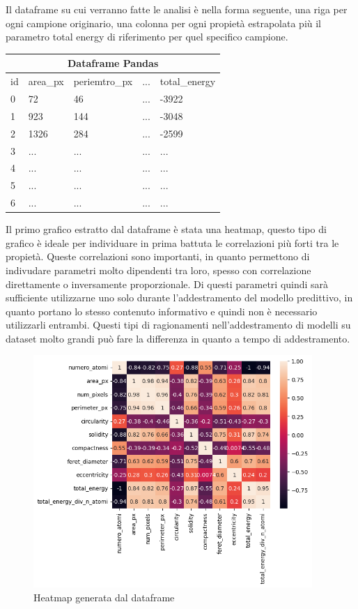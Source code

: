 \documentclass[12pt,a4paper,openright,twoside]{report}
\begin{document}
Il dataframe su cui verranno fatte le analisi è nella forma seguente, una riga per ogni campione originario, una colonna per ogni propietà estrapolata più il parametro total energy di riferimento per quel specifico campione. 

\begin{center}
\begin{tabular}{ |p{1cm}||p{1.5cm}|p{2.5cm}|p{1cm}|p{3cm}|  }
 \hline
 \multicolumn{5}{|c|}{Dataframe Pandas} \\
 \hline
 id & area\_px & periemtro\_px & ... & total\_energy \\
 \hline
 0 & 72 & 46 & ... & -3922\\
 1 & 923 & 144 & ... & -3048\\
 2 & 1326 & 284 & ... & -2599\\
 3 & ... & ... & ... & ...\\
 4 & ... & ... & ... & ...\\
 5 & ... & ... & ... & ...\\
 6 & ... & ... & ... & ...\\
 \hline
\end{tabular}    
\end{center}
Il primo grafico estratto dal dataframe è stata una heatmap, questo tipo di grafico è ideale per individuare in prima battuta le correlazioni più forti tra le propietà.
Queste correlazioni sono importanti, in quanto permettono di indivudare parametri molto dipendenti tra loro, spesso con correlazione direttamente o inversamente proporzionale. 
Di questi parametri quindi sarà sufficiente utilizzarne uno solo durante l'addestramento del modello predittivo, in quanto portano lo stesso contenuto informativo e quindi non è necessario utilizzarli entrambi. Questi tipi di ragionamenti nell'addestramento di modelli su dataset molto grandi può fare la differenza in quanto a tempo di addestramento.
\begin{center}
\begin{figure}[h]
\centering
\includegraphics[width=400px,keepaspectratio]{heatmap.png}
\caption{Heatmap generata dal dataframe}
\end{figure}    
\end{center}
\end{document}
